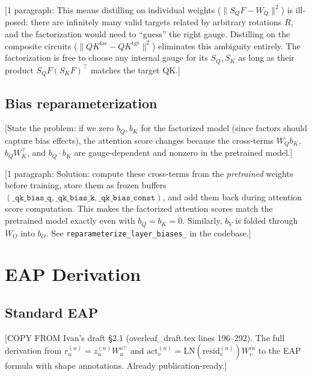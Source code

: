 \documentclass[11pt]{article}
\begin{document}
[1 paragraph: This means distilling on individual weights
($\|S_Q F - W_Q\|^2$) is ill-posed: there are infinitely many valid
targets related by arbitrary rotations $R$, and the factorization would
need to ``guess'' the right gauge. Distilling on the composite circuits
($\|QK^{\text{fac}} - QK^{\text{tgt}}\|^2$) eliminates this ambiguity
entirely. The factorization is free to choose any internal gauge for its
$S_Q, S_K$ as long as their product $S_Q F (S_K F)^\top$ matches the
target QK.]

\subsection{Bias reparameterization}

[State the problem: if we zero $b_Q, b_K$ for the factorized model
(since factors should capture bias effects), the attention score changes
because the cross-terms $W_Q b_K$, $b_Q W_K^\top$, and $b_Q \cdot b_K$
are gauge-dependent and nonzero in the pretrained model.]

[1 paragraph: Solution: compute these cross-terms from the \emph{pretrained}
weights before training, store them as frozen buffers
$(\texttt{\_qk\_bias\_q}, \texttt{\_qk\_bias\_k}, \texttt{\_qk\_bias\_const})$,
and add them back during attention score computation. This makes the
factorized attention scores match the pretrained model exactly even with
$b_Q = b_K = 0$. Similarly, $b_V$ is folded through $W_O$ into $b_O$.
See \texttt{reparameterize\_layer\_biases\_} in the codebase.]



\section{EAP Derivation}
\label{app:eap_derivation}


\subsection{Standard EAP}

[COPY FROM Ivan's draft \S2.1 (overleaf\_draft.tex lines 196--292).
The full derivation from $r_u^{(n)} = z_u^{(n)} W_u^{o\top}$ and
$\text{act}_v^{(n)} = \text{LN}(\text{resid}_v^{(n)}) W_v^{in}$ to
the EAP formula with shape annotations. Already publication-ready.]
\end{document}
